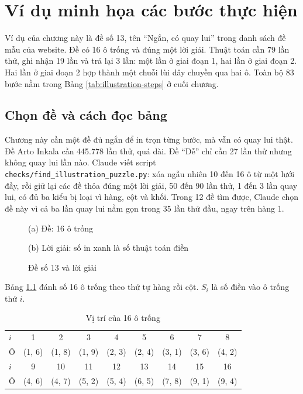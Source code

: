 \chapter{Ví dụ minh họa các bước thực hiện}

Ví dụ của chương này là đề số 13, tên ``Ngắn, có quay lui'' trong danh sách đề mẫu của website. Đề có 16 ô trống và đúng một lời giải. Thuật toán cần 79 lần thử, ghi nhận 19 lần và trả lại 3 lần: một lần ở giai đoạn 1, hai lần ở giai đoạn 2. Hai lần ở giai đoạn 2 hợp thành một chuỗi lùi dây chuyền qua hai ô. Toàn bộ 83 bước nằm trong Bảng \ref{tab:illustration-steps} ở cuối chương.

\section{Chọn đề và cách đọc bảng}

Chương này cần một đề đủ ngắn để in trọn từng bước, mà vẫn có quay lui thật. Đề Arto Inkala cần 445.778 lần thử, quá dài. Đề ``Dễ'' chỉ cần 27 lần thử nhưng không quay lui lần nào. Claude viết script \texttt{checks/find\_illustration\_puzzle.py}: xóa ngẫu nhiên 10 đến 16 ô từ một lưới đầy, rồi giữ lại các đề thỏa đúng một lời giải, 50 đến 90 lần thử, 1 đến 3 lần quay lui, có đủ ba kiểu bị loại vì hàng, cột và khối. Trong 12 đề tìm được, Claude chọn đề này vì cả ba lần quay lui nằm gọn trong 35 lần thử đầu, ngay trên hàng 1.

\begin{figure}[H]
  \centering
  \begin{minipage}[t]{0.46\linewidth}
    \centering
    
    \par\smallskip\small (a) Đề: 16 ô trống
  \end{minipage}
  \hfill
  \begin{minipage}[t]{0.46\linewidth}
    \centering
    
    \par\smallskip\small (b) Lời giải: số in xanh là số thuật toán điền
  \end{minipage}
  \caption{Đề số 13 và lời giải}
  \label{fig:illustration-grids}
\end{figure}

Bảng \ref{tab:illustration-cells} đánh số 16 ô trống theo thứ tự hàng rồi cột. \(S_i\) là số điền vào ô trống thứ \(i\).

\begin{table}[H]
  \centering
  \caption{Vị trí của 16 ô trống}
  \label{tab:illustration-cells}
  \small
  \begin{tabular}{@{}l*{8}{c}@{}}
    \toprule
    \(i\) & 1 & 2 & 3 & 4 & 5 & 6 & 7 & 8 \\
    Ô & (1, 6) & (1, 8) & (1, 9) & (2, 3) & (2, 4) & (3, 1) & (3, 6) & (4, 2) \\
    \midrule
    \(i\) & 9 & 10 & 11 & 12 & 13 & 14 & 15 & 16 \\
    Ô & (4, 6) & (4, 7) & (5, 2) & (5, 4) & (6, 5) & (7, 8) & (9, 1) & (9, 4) \\
    \bottomrule
  \end{tabular}
\end{table}

